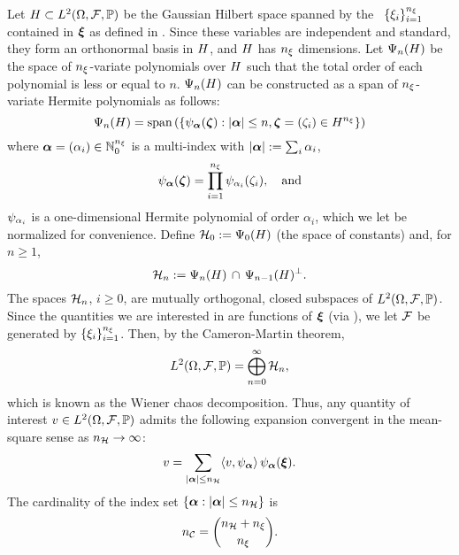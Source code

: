 Let $H \subset L^{2}(\Omega, \mathcal{F}, \mathbb{P})$ be the Gaussian Hilbert space \cite{janson1997} spanned by the \rvs\ $\{ \xi_i \}_{i = 1}^{n_\xi}$ contained in $\bm{\xi}$ as defined in .
Since these variables are independent and standard, they form an orthonormal basis in $H$, and $H$ has ${n_\xi}$ dimensions.
Let $\Psi_n(H)$ be the space of ${n_\xi}$-variate polynomials over $H$ such that the total order of each polynomial is less or equal to $n$.
$\Psi_n(H)$ can be constructed as a span of ${n_\xi}$-variate Hermite polynomials \cite{maitre2010, eldred2008} as follows:
\[
  \Psi_{n}(H) = \text{span}\left( \left\{ \psi_{\bm{\alpha}}(\bm{\zeta}): |\bm{\alpha}| \leq n, \bm{\zeta} = (\zeta_i) \in H^{n_\xi} \right\} \right)
\]
where $\bm{\alpha} = (\alpha_i) \in \mathbb{N}_{0}^{n_\xi}$ is a multi-index with $|\bm{\alpha}| := \sum_i \alpha_i$,
\[
  \psi_{\bm{\alpha}}(\bm{\zeta}) = \prod_{i = 1}^{n_\xi} \psi_{\alpha_i}(\zeta_i), \hspace{1em} \text{and}
\]
$\psi_{\alpha_i}$ is a one-dimensional Hermite polynomial of order $\alpha_i$, which we let be normalized for convenience.
Define $\mathcal{H}_0 := \Psi_0(H)$ (the space of constants) and, for $n \geq 1$,
\[
  \mathcal{H}_n := \Psi_n(H) \, \cap \, \Psi_{n - 1}(H)^\perp.
\]
The spaces $\mathcal{H}_n$, $i \geq 0$, are mutually orthogonal, closed subspaces of $L^{2}(\Omega, \mathcal{F}, \mathbb{P})$.
Since the quantities we are interested in are functions of $\bm{\xi}$ (via ), we let $\mathcal{F}$ be generated by $\{ \xi_i \}_{i = 1}^{n_\xi}$.
Then, by the Cameron-Martin theorem,
\[
  L^{2}(\Omega, \mathcal{F}, \mathbb{P}) = \bigoplus_{n = 0}^\infty \mathcal{H}_n,
\]
which is known as the Wiener chaos decomposition.
Thus, any quantity of interest $v \in L^{2}(\Omega, \mathcal{F}, \mathbb{P})$ admits the following expansion convergent in the mean-square sense as ${n_\mathcal{H}} \to \infty$:
\begin{equation} \xelab{wiener-chaos-decomposition}
  \w = \sum_{|\multiindex| \leq \ncorder} \innerProduct{\w, \polynomial_{\multiindex}} \, \polynomial_{\multiindex}(\vz).
\end{equation}
The cardinality of the index set $\{ \bm{\alpha}: |\bm{\alpha}| \leq {n_\mathcal{H}} \}$ is
\[
  {n_\mathcal{C}} = { {n_\mathcal{H}} + {n_\xi} \choose {n_\xi} }.
\]
